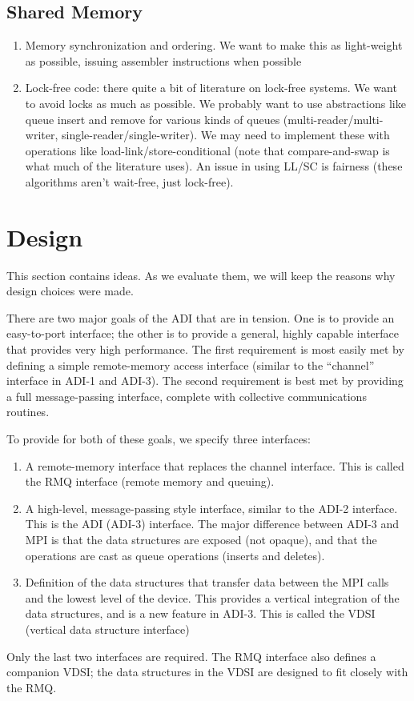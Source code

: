 \documentclass{article}
\begin{document}
\subsection{Shared Memory}
\begin{enumerate}
\item Memory synchronization and ordering.  We want to make this as
  light-weight as possible, issuing assembler instructions when possible
\item Lock-free code: there quite a bit of literature on lock-free systems.
  We want to avoid locks as much as possible.  We probably want to use
  abstractions like queue insert and remove for various kinds of queues
  (multi-reader/multi-writer, single-reader/single-writer).  We may need to
  implement these with operations like load-link/store-conditional (note that
  compare-and-swap is what much of the literature uses).  An issue in using
  LL/SC is fairness (these algorithms aren't wait-free, just lock-free).
\end{enumerate}

\section{Design}

This section contains ideas.  As we evaluate them, we will keep the reasons
why design choices were made.

There are two major goals of the ADI that are in tension.  One is to provide
an easy-to-port interface; the other is to provide a general, highly capable
interface that provides very high performance.  The first requirement is most
easily met by defining a simple remote-memory access interface (similar to the
``channel'' interface in ADI-1 and ADI-3).  The second requirement is best met
by providing a full message-passing interface, complete with collective
communications routines.  

To provide for both of these goals, we specify three interfaces:
\begin{enumerate}
\item A remote-memory interface that replaces the channel interface. This is
  called the RMQ interface (remote memory and queuing).
\item A high-level, message-passing style interface, similar to the ADI-2
  interface.  This is the ADI (ADI-3) interface.  The major difference between
  ADI-3 and MPI is that the data structures are exposed (not opaque), and that
  the operations are cast as queue operations (inserts and deletes).
\item Definition of the data structures that transfer data between the MPI
  calls and the lowest level of the device.  This provides a vertical
  integration of the data structures, and is a new feature in ADI-3.  This is
  called the VDSI (vertical data structure interface)
\end{enumerate}
Only the last two interfaces are required.  The RMQ interface also defines a
companion VDSI; the data structures in the VDSI are designed to fit closely
with the RMQ.
\end{document}
